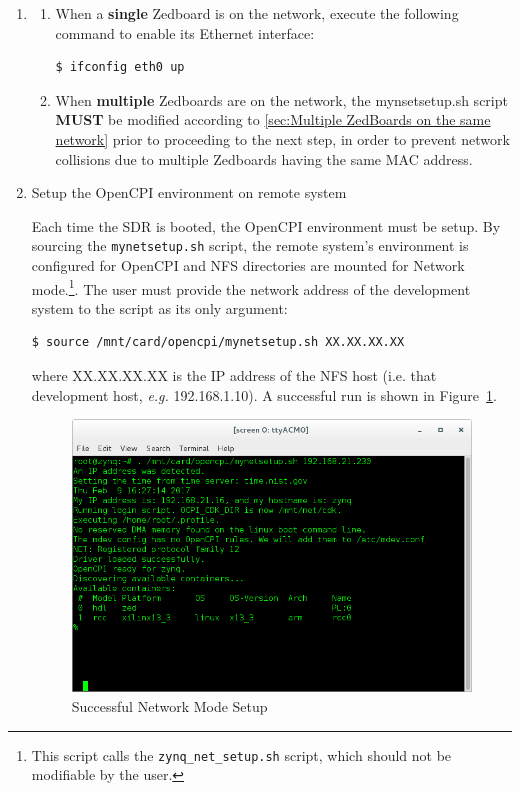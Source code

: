 \begin{enumerate}
\item
\begin{enumerate}
	\item When a \textbf{single} Zedboard is on the network, execute the following command to enable its Ethernet interface:
\begin{verbatim}
$ ifconfig eth0 up
\end{verbatim} \medskip
	\item When \textbf{multiple} Zedboards are on the network, the mynsetsetup.sh script \textbf{MUST} be modified according to \ref{sec:Multiple ZedBoards on the same network} prior to proceeding to the next step, in order to prevent network collisions due to multiple Zedboards having the same MAC address.
\end{enumerate}

\item Setup the OpenCPI environment on remote system

\begin{flushleft}
Each time the SDR is booted, the OpenCPI environment must be setup. By sourcing the \texttt{mynetsetup.sh} script, the remote system's environment is configured for OpenCPI and NFS directories are mounted for Network mode.\footnote{This script calls the \texttt{zynq\_net\_setup.sh} script, which should not be modifiable by the user.}. The user must provide the network address of the development system to the script as its only argument:
\begin{verbatim}
$ source /mnt/card/opencpi/mynetsetup.sh XX.XX.XX.XX
\end{verbatim} \medskip

where XX.XX.XX.XX is the IP address of the NFS host (i.e. that development host, \textit{e.g.} 192.168.1.10). A successful run is shown in Figure~\ref{fig:netsetup}. \medskip

\end{flushleft}

\begin{figure}[H]
	\centerline{\includegraphics[scale=0.5]{zed_net_setup}}
	\caption{Successful Network Mode Setup}
	\label{fig:netsetup}
\end{figure} \medskip



\end{enumerate}

